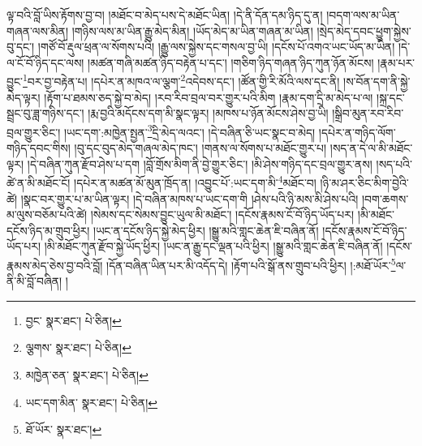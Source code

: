 ལྟ་བའི་བློ་ཡིས་རྟོགས་བྱ་བ། །མཐོང་བ་མེད་པས་དེ་མཐོང་ཡིན། །དེ་ནི་དོན་དམ་ཉིད་དུ་ན། །བདག་ལས་མ་ཡིན་གཞན་ལས་མིན། །གཉིས་ལས་མ་ཡིན་རྒྱུ་མེད་མིན། །ཡོད་མེད་མ་ཡིན་གཞན་མ་ཡིན། །སྲེད་མེད་དབང་ཕྱུག་སྐྱེས་བུ་དང་། །གཙོ་བོ་རྡུལ་ཕྲན་ལ་སོགས་པའི། །རྒྱུ་ལས་སྐྱེས་དང་གསལ་བྱ་ཡི། །དངོས་པོ་འགའ་ཡང་ཡོད་མ་ཡིན། །དེ་ལ་ངོ་བོ་ཉིད་དང་ལས། །མཚན་གཞི་མཚན་ཉིད་བརྟེན་པ་དང་། །གཅིག་ཉིད་གཞན་ཉིད་ཀུན་ཉོན་མོངས། །རྣམ་པར་བྱུང་\footnote{བྱང་  སྣར་ཐང་།  པེ་ཅིན། }བར་བྱ་བརྟེན་པ། །དཔེར་ན་མཁའ་ལ་ལྕག་\footnote{ལྕགས་  སྣར་ཐང་།  པེ་ཅིན། }འདེབས་དང་། །ཚོན་གྱི་རི་མོའི་ལས་དང་ནི། །ས་བོན་དག་ནི་སྐྱེ་མེད་ལྟར། །རྟོག་པ་ཐམས་ཅད་སྐྱེ་བ་མེད། །རབ་རིབ་བྲལ་བར་གྱུར་པའི་མིག །རྣམ་དག་དྲི་མ་མེད་པ་ལ། །སྐྲ་དང་སྦྲང་བུ་ཟླ་གཉིས་དང་། །རྨ་བྱའི་མདོངས་དག་མི་སྣང་ལྟར། །མཁས་པ་ཉོན་མོངས་ཤེས་བྱ་ཡི། །སྒྲིབ་མུན་རབ་རིབ་བྲལ་གྱུར་ཅིང་། །ཡང་དག་:མཁྱེན་སྤྱན་\footnote{མཁྱེན་ཅན་  སྣར་ཐང་།  པེ་ཅིན། }དྲི་མེད་ལའང་། །དེ་བཞིན་ཅི་ཡང་སྣང་བ་མེད། །དཔེར་ན་གཉིད་ལོག་གཉིད་དབང་གིས། །བུ་དང་བུད་མེད་གཞལ་མེད་ཁང་། །གནས་ལ་སོགས་པ་མཐོང་གྱུར་པ། །སད་ན་དེ་ལ་མི་མཐོང་ལྟར། །དེ་བཞིན་ཀུན་རྫོབ་ཤེས་པ་དག །བློ་གྲོས་མིག་ནི་བྱེ་གྱུར་ཅིང་། །མི་ཤེས་གཉིད་དང་བྲལ་གྱུར་ནས། །སད་པའི་ཚེ་ན་མི་མཐོང་ངོ། །དཔེར་ན་མཚན་མོ་མུན་ཁྲོད་ན། །འབྱུང་པོ་:ཡང་དག་མི་\footnote{ཡང་དག་མིན་  སྣར་ཐང་།  པེ་ཅིན། }མཐོང་བ། །ཉི་མ་ཤར་ཅིང་མིག་བྱེའི་ཚེ། །སྣང་བར་གྱུར་པ་མ་ཡིན་ལྟར། །དེ་བཞིན་མཁས་པ་ཡང་དག་གི །ཤེས་པའི་ཉི་མས་མི་ཤེས་པའི། །བག་ཆགས་མ་ལུས་བཅོམ་པའི་ཚེ། །སེམས་དང་སེམས་བྱུང་ཡུལ་མི་མཐོང་། །དངོས་རྣམས་ངོ་བོ་ཉིད་ཡོད་པར། །མི་མཐོང་དངོས་ཉིད་མ་གྲུབ་ཕྱིར། །ཡང་ན་དངོས་ཉིད་སྐྱེ་མེད་ཕྱིར། །སྒྱུ་མའི་གླང་ཆེན་ཇི་བཞིན་ནོ། །དངོས་རྣམས་ངོ་བོ་ཉིད་ཡོད་པར། །མི་མཐོང་ཀུན་རྫོབ་སྐྱེ་ཡོད་ཕྱིར། །ཡང་ན་རྒྱུ་དང་ལྡན་པའི་ཕྱིར། །སྒྱུ་མའི་གླང་ཆེན་ཇི་བཞིན་ནོ། །དངོས་རྣམས་མེད་ཅེས་བྱ་བའི་བློ། །དོན་བཞིན་ཡིན་པར་མི་འདོད་དེ། །རྟོག་པའི་སྒོ་ནས་གྲུབ་པའི་ཕྱིར། །:མཐོ་ཡོར་\footnote{ཐོ་ཡོར་  སྣར་ཐང་། }ལ་ནི་མི་བློ་བཞིན། །
